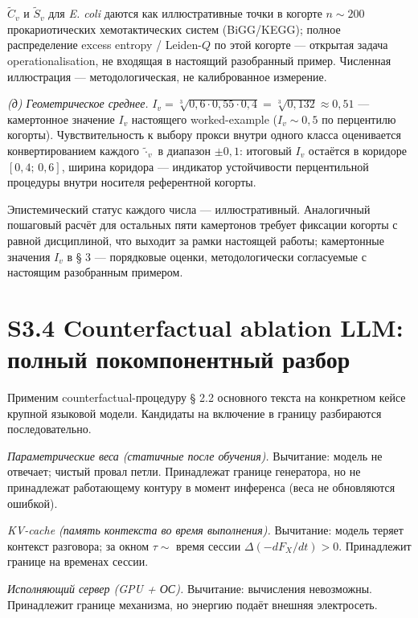 \documentclass[pdflatex,sn-mathphys-ay]{sn-jnl}
\begin{document}
\(\tilde C_v\) и \(\tilde S_v\) для \emph{E. coli} даются как иллюстративные точки в когорте \(n \sim 200\) прокариотических хемотактических систем (BiGG/KEGG); полное распределение excess entropy / Leiden-\(Q\) по этой когорте --- открытая задача operationalisation, не входящая в настоящий разобранный пример. Численная иллюстрация --- методологическая, не калиброванное измерение.

\emph{(д) Геометрическое среднее.} \(I_v = \sqrt[3]{0{,}6 \cdot 0{,}55 \cdot 0{,}4} = \sqrt[3]{0{,}132} \approx 0{,}51\) --- камертонное значение \(I_v\) настоящего worked-example (\(I_v \sim 0{,}5\) по перцентилю когорты). Чувствительность к выбору прокси внутри одного класса оценивается конвертированием каждого \(\tilde{\cdot}_v\) в диапазон \(\pm 0{,}1\): итоговый \(I_v\) остаётся в коридоре \([0{,}4;\, 0{,}6]\), ширина коридора --- индикатор устойчивости перцентильной процедуры внутри носителя референтной когорты.

Эпистемический статус каждого числа --- иллюстративный. Аналогичный пошаговый расчёт для остальных пяти камертонов требует фиксации когорты с равной дисциплиной, что выходит за рамки настоящей работы; камертонные значения \(I_v\) в § 3 --- порядковые оценки, методологически согласуемые с настоящим разобранным примером.

\section*{S3.4 Counterfactual ablation LLM: полный покомпонентный разбор}\label{s3.4-counterfactual-ablation-llm-ux43fux43eux43bux43dux44bux439-ux43fux43eux43aux43eux43cux43fux43eux43dux435ux43dux442ux43dux44bux439-ux440ux430ux437ux431ux43eux440}

Применим counterfactual-процедуру § 2.2 основного текста на конкретном кейсе крупной языковой модели. Кандидаты на включение в границу разбираются последовательно.

\emph{Параметрические веса (статичные после обучения).} Вычитание: модель не отвечает; чистый провал петли. Принадлежат границе генератора, но не принадлежат работающему контуру в момент инференса (веса не обновляются ошибкой).

\emph{KV-cache (память контекста во время выполнения).} Вычитание: модель теряет контекст разговора; за окном \(\tau \sim\) время сессии \(\Delta(-dF_X/dt) > 0\). Принадлежит границе на временах сессии.

\emph{Исполняющий сервер (GPU + ОС).} Вычитание: вычисления невозможны. Принадлежит границе механизма, но энергию подаёт внешняя электросеть.
\end{document}
